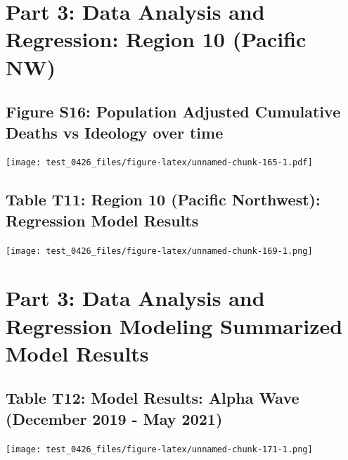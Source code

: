 \documentclass[
]{article}
\begin{document}
\hypertarget{part-3-data-analysis-and-regression-region-10-pacific-nw}{%
\section{Part 3: Data Analysis and Regression: Region 10 (Pacific
NW)}\label{part-3-data-analysis-and-regression-region-10-pacific-nw}}

\hypertarget{figure-s16-population-adjusted-cumulative-deaths-vs-ideology-over-time}{%
\subsection{Figure S16: Population Adjusted Cumulative Deaths vs
Ideology over
time}\label{figure-s16-population-adjusted-cumulative-deaths-vs-ideology-over-time}}

\texttt{[image: test\_0426\_files/figure-latex/unnamed-chunk-165-1.pdf]}

\hypertarget{table-t11-region-10-pacific-northwest-regression-model-results}{%
\subsection{Table T11: Region 10 (Pacific Northwest): Regression Model
Results}\label{table-t11-region-10-pacific-northwest-regression-model-results}}

\texttt{[image: test\_0426\_files/figure-latex/unnamed-chunk-169-1.png]}

\newpage

\newpage

\hypertarget{part-3-data-analysis-and-regression-modeling-summarized-model-results}{%
\section{Part 3: Data Analysis and Regression Modeling Summarized Model
Results}\label{part-3-data-analysis-and-regression-modeling-summarized-model-results}}

\hypertarget{table-t12-model-results-alpha-wave-december-2019---may-2021}{%
\subsection{Table T12: Model Results: Alpha Wave (December 2019 - May
2021)}\label{table-t12-model-results-alpha-wave-december-2019---may-2021}}

\texttt{[image: test\_0426\_files/figure-latex/unnamed-chunk-171-1.png]}
\end{document}
